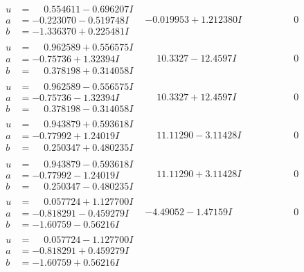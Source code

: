 \documentclass[1p]{elsarticle_modified}
\theoremstyle{definition}
\begin{document}
$$\begin{array}{c|c|c}
\begin{aligned}
u &= \phantom{-}0.554611 - 0.696207 I \\
a &= -0.223070 - 0.519748 I \\
b &= -1.336370 + 0.225481 I\end{aligned}
 & -0.019953 + 1.212380 I & \phantom{-0.000000 } 0 \\ \hline\begin{aligned}
u &= \phantom{-}0.962589 + 0.556575 I \\
a &= -0.75736 + 1.32394 I \\
b &= \phantom{-}0.378198 + 0.314058 I\end{aligned}
 & \phantom{-}10.3327 - 12.4597 I & \phantom{-0.000000 } 0 \\ \hline\begin{aligned}
u &= \phantom{-}0.962589 - 0.556575 I \\
a &= -0.75736 - 1.32394 I \\
b &= \phantom{-}0.378198 - 0.314058 I\end{aligned}
 & \phantom{-}10.3327 + 12.4597 I & \phantom{-0.000000 } 0 \\ \hline\begin{aligned}
u &= \phantom{-}0.943879 + 0.593618 I \\
a &= -0.77992 + 1.24019 I \\
b &= \phantom{-}0.250347 + 0.480235 I\end{aligned}
 & \phantom{-}11.11290 - 3.11428 I & \phantom{-0.000000 } 0 \\ \hline\begin{aligned}
u &= \phantom{-}0.943879 - 0.593618 I \\
a &= -0.77992 - 1.24019 I \\
b &= \phantom{-}0.250347 - 0.480235 I\end{aligned}
 & \phantom{-}11.11290 + 3.11428 I & \phantom{-0.000000 } 0 \\ \hline\begin{aligned}
u &= \phantom{-}0.057724 + 1.127700 I \\
a &= -0.818291 - 0.459279 I \\
b &= -1.60759 - 0.56216 I\end{aligned}
 & -4.49052 - 1.47159 I & \phantom{-0.000000 } 0 \\ \hline\begin{aligned}
u &= \phantom{-}0.057724 - 1.127700 I \\
a &= -0.818291 + 0.459279 I \\
b &= -1.60759 + 0.56216 I\end{aligned}

\end{array}$$
\end{document}
